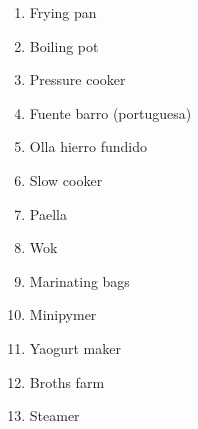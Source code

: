 
\begin{enumerate}
  \item Frying pan
  \item Boiling pot
  \item Pressure cooker
  \item Fuente barro (portuguesa)
  \item Olla hierro fundido
  \item Slow cooker
  \item Paella
  \item Wok
  \item Marinating bags
  \item Minipymer
  \item Yaogurt maker
  \item Broths farm
  \item Steamer
\end{enumerate}
